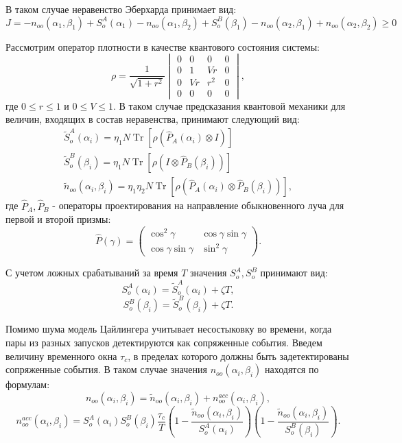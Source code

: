 \documentclass[%
master,         %
subf,           %
href,           %
,times         %
]{disser}
\DeclareMathOperator{\Tr}{Tr}
\numberwithin{equation}{section}
\numberwithin{figure}{section}
\begin{document}
В таком случае неравенство Эберхарда принимает вид:
\begin{equation}
J = -n_{oo}(\alpha_1, \beta_1) + S_o^A(\alpha_1) - n_{oo}(\alpha_1, \beta_2) + S_o^B(\beta_1) - n_{oo}(\alpha_2, \beta_1) + n_{oo}(\alpha_2, \beta_2) \geq 0
\label{eq:Zeilinger_J}
\end{equation}

Рассмотрим оператор плотности в качестве квантового состояния системы:
\[
\rho = \frac{1}{\sqrt{1+r^2}}
\begin{vmatrix}
0 & 0 & 0 & 0\\
0 & 1 & Vr & 0\\
0 & Vr & r^2 & 0\\
0 & 0 & 0 & 0
\end{vmatrix},
\]
где $0 \leq r \leq 1$ и $0 \leq V \leq 1$.
В таком случае предсказания квантовой механики для величин, входящих в состав неравенства, принимают следующий вид:
\begin{eqnarray*}
\tilde{S}_o^A(\alpha_i) = \eta_1 N \Tr[\rho(\hat{P}_A(\alpha_i) \otimes I)]\\
\tilde{S}_o^B(\beta_i) = \eta_1 N \Tr[\rho(I \otimes \hat{P}_B(\beta_i))]\\
\tilde{n}_{oo}(\alpha_i, \beta_i) = \eta_1\eta_2 N \Tr[\rho(\hat{P}_A(\alpha_i) \otimes \hat{P}_B(\beta_i))],
\end{eqnarray*}
где $\hat{P}_A, \hat{P}_B$ - операторы проектирования на направление обыкновенного луча для первой и второй призмы:
\[
\hat{P}(\gamma) = 
\begin{pmatrix}
\cos^2\gamma & \cos\gamma\sin\gamma\\
\cos\gamma\sin\gamma & \sin^2\gamma
\end{pmatrix}.
\]

С учетом ложных срабатываний за время $T$ значения $S_o^A, S_o^B$ принимают вид:
\[
S_o^A(\alpha_i) = \tilde{S}_o^A(\alpha_i) + \zeta T,
\]
\[
S_o^B(\beta_i) = \tilde{S}_o^B(\beta_i) + \zeta T.
\]

Помимо шума модель Цайлингера учитывает несостыковку во времени, когда пары из разных запусков детектируются как сопряженные события. Введем величину временного окна $\tau_c$, в пределах которого должны быть задетектированы сопряженные события. В таком случае значения $n_{oo}(\alpha_i, \beta_i)$ находятся по формулам:
\[
n_{oo}(\alpha_i, \beta_i) = \tilde{n}_{oo}(\alpha_i, \beta_i) + n_{oo}^{acc}(\alpha_i, \beta_i),
\]
\[
n_{oo}^{acc}(\alpha_i, \beta_i) = S_o^A(\alpha_i)S_o^B(\beta_i)\frac{\tau_c}{T}\left(1 - \frac{\tilde{n}_{oo}(\alpha_i, \beta_i)}{S_o^A(\alpha_i)}\right) \left( 1 - \frac{\tilde{n}_{oo}(\alpha_i, \beta_i)}{S_o^B(\beta_i)}\right).
\]
\end{document}

